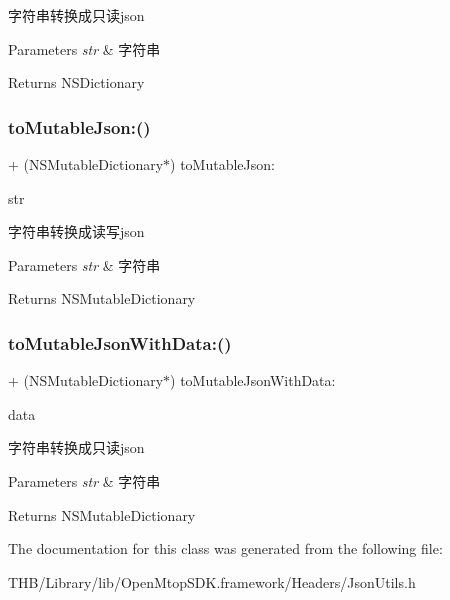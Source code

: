 字符串转换成只读json 
\begin{DoxyParams}{Parameters}
{\em str} & 字符串 \\
\hline
\end{DoxyParams}
\begin{DoxyReturn}{Returns}
N\+S\+Dictionary 
\end{DoxyReturn}
\mbox{\label{interface_json_utils_a2f225625dae276cff87320b4f6808f33}} 
\subsubsection{\texorpdfstring{to\+Mutable\+Json\+:()}{toMutableJson:()}}
{\footnotesize\ttfamily + (N\+S\+Mutable\+Dictionary$\ast$) to\+Mutable\+Json\+: \begin{DoxyParamCaption}\item[{(N\+S\+String $\ast$)}]{str }\end{DoxyParamCaption}}

字符串转换成读写json 
\begin{DoxyParams}{Parameters}
{\em str} & 字符串 \\
\hline
\end{DoxyParams}
\begin{DoxyReturn}{Returns}
N\+S\+Mutable\+Dictionary 
\end{DoxyReturn}
\mbox{\label{interface_json_utils_a22779aabf7a0add657d6d2f3522fea43}} 
\subsubsection{\texorpdfstring{to\+Mutable\+Json\+With\+Data\+:()}{toMutableJsonWithData:()}}
{\footnotesize\ttfamily + (N\+S\+Mutable\+Dictionary$\ast$) to\+Mutable\+Json\+With\+Data\+: \begin{DoxyParamCaption}\item[{(N\+S\+Data $\ast$)}]{data }\end{DoxyParamCaption}}

字符串转换成只读json 
\begin{DoxyParams}{Parameters}
{\em str} & 字符串 \\
\hline
\end{DoxyParams}
\begin{DoxyReturn}{Returns}
N\+S\+Mutable\+Dictionary 
\end{DoxyReturn}


The documentation for this class was generated from the following file\+:\begin{DoxyCompactItemize}
\item 
T\+H\+B/\+Library/lib/\+Open\+Mtop\+S\+D\+K.\+framework/\+Headers/Json\+Utils.\+h\end{DoxyCompactItemize}
